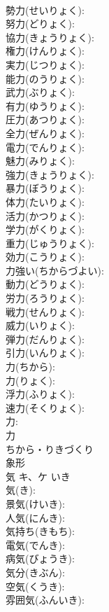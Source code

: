 \documentclass[8pt]{extreport}
\begin{document}
\begin{CJK}{UTF8}{min}
\\	勢力(せいりょく): 
\\	努力(どりょく): 
\\	協力(きょうりょく): 
\\	権力(けんりょく): 
\\	実力(じつりょく): 
\\	能力(のうりょく): 
\\	武力(ぶりょく): 
\\	有力(ゆうりょく): 
\\	圧力(あつりょく): 
\\	全力(ぜんりょく): 
\\	電力(でんりょく): 
\\	魅力(みりょく): 
\\	強力(きょうりょく): 
\\	暴力(ぼうりょく): 
\\	体力(たいりょく): 
\\	活力(かつりょく): 
\\	学力(がくりょく): 
\\	重力(じゅうりょく): 
\\	効力(こうりょく): 
\\	力強い(ちからづよい): 
\\	動力(どうりょく): 
\\	労力(ろうりょく): 
\\	戦力(せんりょく): 
\\	威力(いりょく): 
\\	弾力(だんりょく): 
\\	引力(いんりょく): 
\\	力(ちから): 
\\	力(りょく): 
\\	浮力(ふりょく): 
\\	速力(そくりょく): 
\\	力: 
\\	力	
\\	ちから・りきづくり	
\\	象形 
\\	気	キ、ケ	いき		
\\	気(き): 
\\	景気(けいき): 
\\	人気(にんき): 
\\	気持ち(きもち): 
\\	電気(でんき): 
\\	病気(びょうき): 
\\	気分(きぶん): 
\\	空気(くうき): 
\\	雰囲気(ふんいき): 

\end{CJK}
\end{document}
